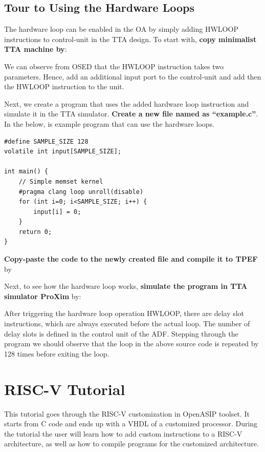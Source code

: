 \documentclass[a4paper,twoside]{tceusermanual}
\begin{document}
\subsection{Tour to Using the Hardware Loops}
The hardware loop can be enabled in the OA by simply adding HWLOOP
instructions to control-unit in the TTA design. To start with, \textbf{copy
minimalist TTA machine by}:


We can observe from OSED that the HWLOOP instruction takes two parameters.
Hence, add an additional input port to the control-unit and add then the
HWLOOP instruction to the unit.

Next, we create a program that uses the added hardware loop instruction
and simulate it in the TTA simulator. \textbf{Create a new file named as
``example.c''}. In the below, is example program that can use the hardware
loops.

\begin{verbatim}
#define SAMPLE_SIZE 128
volatile int input[SAMPLE_SIZE];

int main() {
    // Simple memset kernel
    #pragma clang loop unroll(disable)
    for (int i=0; i<SAMPLE_SIZE; i++) {
        input[i] = 0;
    }
    return 0;
}
\end{verbatim}

\textbf{Copy-paste the code to the newly created file and compile it to TPEF} by


Next, to see  how the hardware loop works,  \textbf{simulate the program
  in TTA simulator ProXim} by:


After triggering the hardware loop operation HWLOOP, there are delay
slot instructions,  which are  always executed before the  actual loop.
The number  of delay slots is  defined in the control  unit of  the ADF.
Stepping  through the  program we  should observe that the loop in the
above source  code is repeated by 128 times before exiting the  loop.


\section{RISC-V Tutorial}
\label{sec:riscvtute}
This tutorial goes through the RISC-V customization in OpenASIP toolset. It
starts from C code and ends up with a VHDL of a customized processor.
During the tutorial the user will learn how to add custom instructions to a 
RISC-V architecture, as well as how to compile programs for the customized
architecture.
\end{document}
